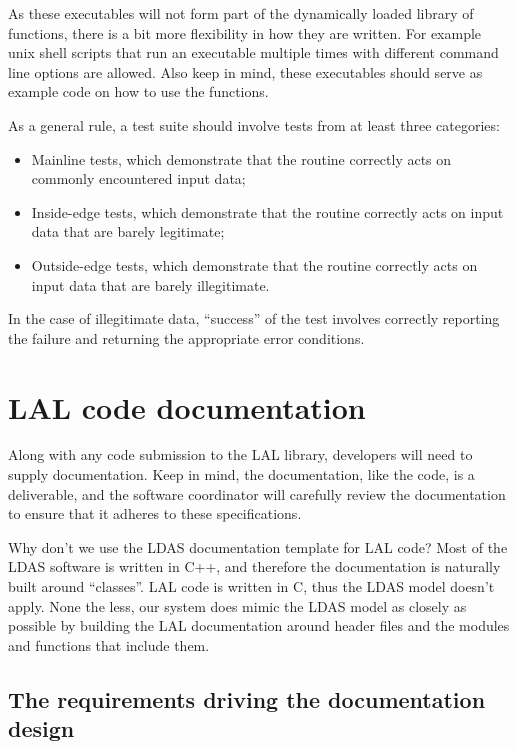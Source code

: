 \documentclass[]{ligodcc}
\begin{document}
As these executables will not form part of the dynamically loaded
library of functions, there is a bit more flexibility in how they are
written.  For example unix shell scripts that run an executable
multiple times with different command line options are allowed. Also
keep in mind, these executables should serve as example code on  how
to use the functions.

As a general rule, a test suite should involve tests from at least
three categories:
\begin{itemize}
   \item
   Mainline tests, which demonstrate that the routine correctly
   acts on commonly encountered input data;
   \item
   Inside-edge tests, which demonstrate that the routine
   correctly acts on input data that are barely legitimate;
   \item
   Outside-edge tests, which demonstrate that the routine
   correctly acts on input data that are barely illegitimate.
\end{itemize}

In the case of illegitimate data, ``success'' of the test involves
correctly reporting the failure and  returning the appropriate error
conditions.

\section{LAL code documentation}
\label{sec:laldocumentation}

Along with any code submission to the LAL library, developers  will
need to supply documentation. Keep in mind, the documentation, like
the code, is a deliverable, and the software coordinator will
carefully review the documentation to ensure that  it adheres to these
specifications.

Why don't we use the LDAS documentation template for LAL code? Most of
the LDAS software is written in C++, and therefore the documentation
is naturally built around ``classes''. LAL code is written in C, thus
the LDAS model doesn't apply. None the less, our system does mimic the
LDAS model as closely as possible by building the LAL documentation
around header files and the modules and functions that include them.

\subsection{The requirements driving  the documentation design}
\end{document}

